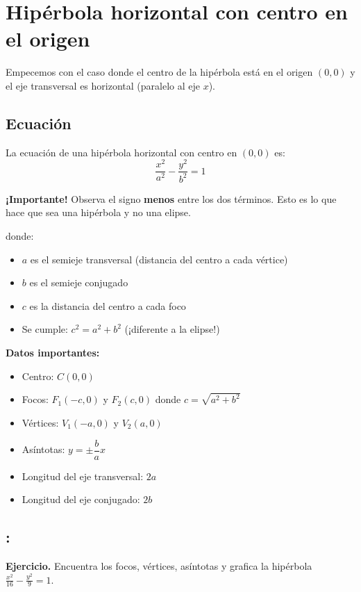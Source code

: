 \documentclass[12pt,a4paper]{article}
\begin{document}
	\section{Hipérbola horizontal con centro en el origen}

	Empecemos con el caso donde el centro de la hipérbola está en el origen $(0,0)$ y el eje transversal es horizontal (paralelo al eje $x$).

	\subsection*{Ecuación}

	La ecuación de una hipérbola horizontal con centro en $(0,0)$ es:
	\[
	\boxed{\frac{x^2}{a^2}-\frac{y^2}{b^2}=1}
	\]

	\textbf{¡Importante!} Observa el signo \textbf{menos} entre los dos términos. Esto es lo que hace que sea una hipérbola y no una elipse.

	\bigskip

	donde:
	\begin{itemize}
		\item $a$ es el semieje transversal (distancia del centro a cada vértice)
		\item $b$ es el semieje conjugado
		\item $c$ es la distancia del centro a cada foco
		\item Se cumple: $\boxed{c^2=a^2+b^2}$ (¡diferente a la elipse!)
	\end{itemize}

	\textbf{Datos importantes:}
	\begin{itemize}
		\item Centro: $C(0,0)$
		\item Focos: $F_1(-c,0)$ y $F_2(c,0)$ donde $c=\sqrt{a^2+b^2}$
		\item Vértices: $V_1(-a,0)$ y $V_2(a,0)$
		\item Asíntotas: $y=\pm\dfrac{b}{a}x$
		\item Longitud del eje transversal: $2a$
		\item Longitud del eje conjugado: $2b$
	\end{itemize}

	\subsection*{{\color{blue!50!red}{Ejemplo 1}}: \color{blue!80!black}{Hipérbola horizontal con centro en el origen}}

	\textbf{Ejercicio.} Encuentra los focos, vértices, asíntotas y grafica la hipérbola $\displaystyle\frac{x^2}{16}-\frac{y^2}{9}=1$.
\end{document}
